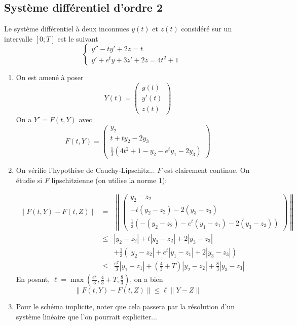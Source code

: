 \documentclass[a4paper]{article}
\begin{document}
\begin{enumerate}
\section{Système différentiel  d'ordre 2}
Le système différentiel à deux inconnues $y(t)$ et $z(t)$ considéré sur un intervalle $[0; T]$ est le suivant
\[
\left\{\begin{array}{l}
y''-ty'+2z=t\\
y'+e^ty+3z'+2z=4t^2+1
\end{array}\right.
\]
\begin{enumerate}
\item On est amené à poser
\[Y(t)=\left(\begin{array}{c} y(t)\\y'(t)\\z(t)
\end{array}\right)\]
On a $Y' = F(t, Y )$ avec
\[F(t,Y)=\left(\begin{array}{c} y_2\\ t+ty_2-2y_3\\\frac 13(4t^2+1-y_2-e^ty_1-2y_3)
\end{array}\right)\]
\item On vérifie l'hypothèse de Cauchy-Lipschitz... $F$ est clairement continue. On étudie si $F$ lipschitzienne (on utilise la norme 1):

\[\begin{array}{ccl} 
\|F(t, Y )-F(t,Z)\|&= &\left\|\left(\begin{array}{c} y_2-z_2\\-t(y_2-z_2)-2(y_3-z_3)\\ \frac 13( -(y_2-z_2) -e^t(y_1-z_1)-2(y_3-z_3)) \end{array}\right)\right\|\\
&\leq &|y_2-z_2|+t|y_2-z_2| +2|y_3-z_3|\\
&        & + \frac 13(|y_2-z_2| +e^t|y_1-z_1|+2|y_3-z_3|)\\
&\leq & \frac{e^T}{3}|y_1-z_1|+(\frac 43+T)|y_2-z_2| +\frac 83|y_3-z_3|
\end{array}
\]
En posant, $\ell =\max( \frac{e^T}{3},\frac 43+T,\frac 83)$,  on a bien
\[\|F(t, Y )-F(t,Z)\|\leq \ell \|Y-Z\|\]
\item Pour le schéma implicite, noter que cela passera par la résolution d'un système linéaire que l'on pourrait expliciter...
\end{enumerate}



\end{enumerate}
\end{document}
